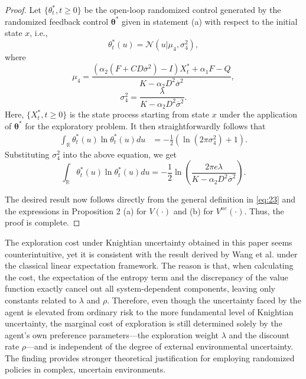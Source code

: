 \documentclass[onecolumn, journal]{IEEEtran} %
\begin{document}
	\begin{proof}
		Let $\{\theta_t^*, t \geq 0\}$ be the open-loop randomized control generated by the randomized feedback control $\boldsymbol{\theta}^*$ given in statement (a) with respect to the initial state $x$, i.e.,
		\[
		\theta_t^*(u) = \mathcal{N}\left(u \big| \mu_4,\sigma_4^2 \right),
		\]
		where
		\[
		\mu_4 = \frac{(\alpha_2(F + CD\overline{\sigma}^2) - I)X_t^* + \alpha_1 F - Q}{K - \alpha_2 D^2 \overline{\sigma}^2},\]
		\[ \sigma_4^2 = \frac{\lambda}{K - \alpha_2 D^2 \overline{\sigma}^2}.
		\]
		Here, $\{X_t^*, t \geq 0\}$ is the state process starting from state $x$ under the application of $\boldsymbol{\theta}^*$ for the exploratory problem. It then straightforwardly follows that
		\[
		\begin{aligned}
			\int_{\mathbb{R}} \theta_t^*(u) \ln \theta_t^*(u) du 
			&= -\frac{1}{2}\left( \ln(2\pi\sigma_4^2) + 1 \right).
		\end{aligned}
		\]
		Substituting $\sigma_4^2$ into the above equation, we get
		\[
		\int_{\mathbb{R}} \theta_t^*(u) \ln \theta_t^*(u) du = -\frac{1}{2} \ln \left( \frac{2\pi e \lambda}{K - \alpha_2 D^2 \overline{\sigma}^2} \right).
		\]
		
		The desired result now follows directly from the general definition in \eqref{eq:23} and the expressions in Proposition 2 (a) for $V(\cdot)$ and (b) for $V^{ne}(\cdot)$. 
		Thus, the proof is complete.
	\end{proof}
	
	The exploration cost under Knightian uncertainty obtained in this paper seems counterintuitive, yet it is consistent with the result derived by Wang et al. \cite{wang2020reinforcement} under the classical linear expectation framework. The reason is that, when calculating the cost, the expectation of the entropy term and the discrepancy of the value function exactly cancel out all system-dependent components, leaving only constants related to $\lambda$ and $\rho$. Therefore, even though the uncertainty faced by the agent is elevated from ordinary risk to the more fundamental level of Knightian uncertainty, the marginal cost of exploration is still determined solely by the agent's own preference parameters—the exploration weight $\lambda$ and the discount rate $\rho$—and is independent of the degree of external environmental uncertainty.
	The finding provides stronger theoretical justification for employing randomized policies in complex, uncertain environments.
	
\end{document}
